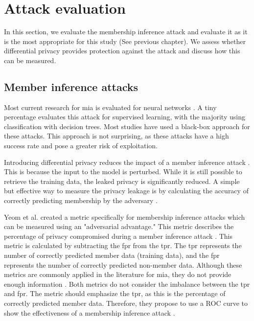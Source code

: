 



\section{Attack evaluation} \label{theory:attack-evaluation}
In this section, we evaluate the membership inference attack and evaluate it as it is the most appropriate for this study (See previous chapter).
We assess whether differential privacy provides protection against the attack and discuss how this can be measured.
\subsection{Member inference attacks}
Most current research for \gls{mia} is evaluated for neural networks \citep{rigaki_survey_2021}.
A tiny percentage evaluates this attack for supervised learning, with the majority using classification with decision trees.
Most studies have used a black-box approach \citep{rigaki_survey_2021} for these attacks.
This approach is not surprising, as these attacks have a high success rate and pose a greater risk of exploitation.

Introducing differential privacy reduces the impact of a member inference attack \citep{rigaki_survey_2021,hu_membership_2022}.
This is because the input to the model is perturbed.
While it is still possible to retrieve the training data, the leaked privacy is significantly reduced.
A simple but effective way to measure the privacy leakage is by calculating the accuracy of correctly predicting membership by the adversary \citep{choquette-choo_label-only_2021}.

Yeom et al. created a metric specifically for membership inference attacks which can be measured using an "adversarial advantage."
This metric describes the percentage of privacy compromised during a member inference attack \citep{yeom_privacy_2018}.
This metric is calculated by subtracting the \gls{fpr} from the \gls{tpr}.
The \gls{tpr} represents the number of correctly predicted member data (training data), and the \gls{fpr} represents the number of correctly predicted non-member data.
Although these metrics are commonly applied in the literature for \gls{mia}, they do not provide enough information \citep{carlini_membership_2022}.
Both metrics do not consider the imbalance between the \gls{tpr} and \gls{fpr}.
The metric should emphasize the \gls{tpr}, as this is the percentage of correctly predicted member data.
Therefore, they propose to use a ROC curve to show the effectiveness of a membership inference attack \citep{carlini_membership_2022}. \newline

